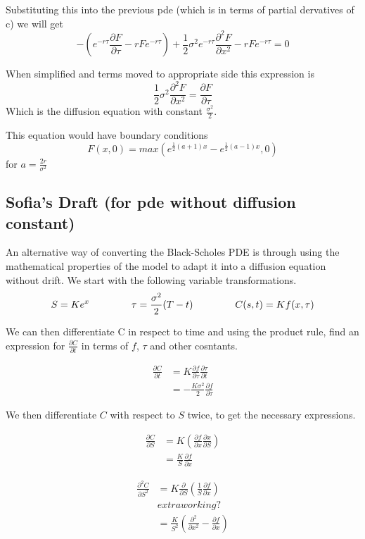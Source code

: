 \documentclass[11pt]{article}
\begin{document}
Substituting this into the previous pde (which is in terms of partial dervatives of c) we will get 
\[
-\left( e^{-r \tau}\frac{\partial F}{\partial \tau} - r F e^{-r \tau} \right) + \frac{1}{2}\sigma^2 e^{-r \tau} \frac{\partial^2 F}{\partial x^2} - r F e^{-r \tau} = 0
\]

When simplified and terms moved to appropriate side this expression is 
\[
\frac{1}{2} \sigma^2 \frac{\partial^2 F}{\partial x^2} = \frac{\partial F}{\partial \tau}
\] 
Which is the diffusion equation with constant $\frac{\sigma^2}{2}$. 

This equation would have boundary conditions \[
F(x,0) = max(e^{\frac{1}{2}(a+1)x }- e^{\frac{1}{2}(a-1)x} , 0)
    \] for $a = \frac{2r}{\sigma^2}$



\subsection{Sofia's Draft (for pde without diffusion constant)}

An alternative way of converting the Black-Scholes PDE is through using the mathematical properties of the model to adapt it into a diffusion equation without drift. We start with the following variable transformations.
\[ S = Ke^x \hspace{1.5cm} \tau = \frac{\sigma^2}{2}(T-t) \hspace{1.5cm} C(s,t) = K f(x,\tau)\]

We can then differentiate C in respect to time and using the product rule, find an expression for $\frac{\partial C}{\partial t}$ in terms of $f$, $\tau$ and other cosntants.

\begin{align*}
    \frac{\partial C}{\partial t} &= K\frac{\partial f}{\partial \tau} \frac{\partial \tau}{\partial t} \\
     &= -\frac{K \sigma^2}{2} \frac{\partial f}{\partial \tau}
\end{align*}

We then differentiate $C$ with respect to $S$ twice, to get the necessary expressions.


\begin{align*}
    \frac{\partial C}{\partial S} & = K \left( \frac{\partial f}{\partial x} \frac{\partial x}{\partial S} \right) \\
    &= \frac{K}{S} \frac{\partial f}{\partial x} 
\end{align*}

\begin{align*}
    \frac{\partial^2 C}{\partial S^2} &= K \frac{\partial}{\partial S} \left( \frac{1}{S} \frac{\partial f}{\partial x} \right) \\
    & extra working? \\
    &= \frac{K}{S^2} \left( \frac{\partial^2}{\partial x^2} - \frac{\partial f}{\partial x} \right)
\end{align*}
\end{document}
